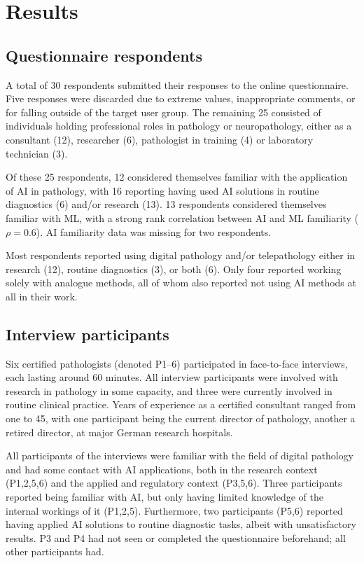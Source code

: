 \section{Results}
\label{sec:results}

\subsection{Questionnaire respondents}

A total of 30 respondents submitted their responses to the online questionnaire. Five responses were discarded due to extreme values, inappropriate comments, or for falling outside of the target user group. The remaining 25 consisted of individuals holding professional roles in pathology or neuropathology, either as a consultant (12), researcher (6), pathologist in training (4) or laboratory technician (3). 

Of these 25 respondents, 12 considered themselves familiar with the application of AI in pathology, with 16 reporting having used AI solutions in routine diagnostics (6) and/or research (13). 13 respondents considered themselves familiar with ML, with a strong rank correlation between AI and ML familiarity (\(\rho = 0.6\)). AI familiarity data was missing for two respondents.

Most respondents reported using digital pathology and/or telepathology either in research (12), routine diagnostics (3), or both (6). Only four reported working solely with analogue methods, all of whom also reported not using AI methods at all in their work. 

\subsection{Interview participants}

Six certified pathologists (denoted P1--6) participated in face-to-face interviews, each lasting around 60 minutes. All interview participants were involved with research in pathology in some capacity, and three were currently involved in routine clinical practice. Years of experience as a certified consultant ranged from one to 45, with one participant being the current director of pathology, another a retired director, at major German research hospitals.

All participants of the interviews were familiar with the field of digital pathology and had some contact with AI applications, both in the research context (P1,2,5,6) and the applied and regulatory context (P3,5,6). Three participants reported being familiar with AI, but only having limited knowledge of the internal workings of it (P1,2,5). Furthermore, two participants (P5,6) reported having applied AI solutions to routine diagnostic tasks, albeit with unsatisfactory results. P3 and P4 had not seen or completed the questionnaire beforehand; all other participants had.

